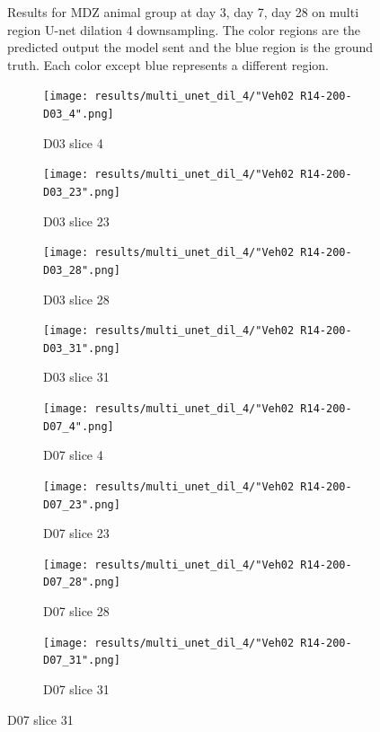 \begin{figure}[!htb]
  \caption{Results for MDZ animal group at day 3, day 7, day 28 on multi region U-net dilation 4 downsampling. The color regions are the predicted output the model sent and the blue region is the ground truth. Each color except blue represents a different region.}
  \label{fig:results_multi_unetdil4_MDZ}
\end{figure}



\begin{figure}[!htb]  
    \centering %
\begin{subfigure}{0.25\textwidth}
  \texttt{[image: results/multi\_unet\_dil\_4/"Veh02 R14-200-D03\_4".png]}
  \caption{D03 slice 4}
\end{subfigure}\hfil %
\begin{subfigure}{0.25\textwidth}
  \texttt{[image: results/multi\_unet\_dil\_4/"Veh02 R14-200-D03\_23".png]}
  \caption{D03 slice 23}
\end{subfigure}\hfil %
\begin{subfigure}{0.25\textwidth}
  \texttt{[image: results/multi\_unet\_dil\_4/"Veh02 R14-200-D03\_28".png]}
  \caption{D03 slice 28}
\end{subfigure}\hfil %
\begin{subfigure}{0.25\textwidth}
  \texttt{[image: results/multi\_unet\_dil\_4/"Veh02 R14-200-D03\_31".png]}
  \caption{D03 slice 31}
\end{subfigure}

\medskip
\begin{subfigure}{0.25\textwidth}
  \texttt{[image: results/multi\_unet\_dil\_4/"Veh02 R14-200-D07\_4".png]}
  \caption{D07 slice 4}
\end{subfigure}\hfil %
\begin{subfigure}{0.25\textwidth}
  \texttt{[image: results/multi\_unet\_dil\_4/"Veh02 R14-200-D07\_23".png]}
  \caption{D07 slice 23}
\end{subfigure}\hfil %
\begin{subfigure}{0.25\textwidth}
  \texttt{[image: results/multi\_unet\_dil\_4/"Veh02 R14-200-D07\_28".png]}
  \caption{D07 slice 28}
\end{subfigure}\hfil %
\begin{subfigure}{0.25\textwidth}
  \texttt{[image: results/multi\_unet\_dil\_4/"Veh02 R14-200-D07\_31".png]}
  \caption{D07 slice 31}
\end{subfigure}


\end{figure}
